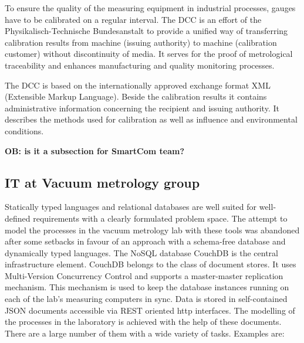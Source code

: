 \documentclass[3p,times,procedia]{elsarticle}
\begin{document}
To ensure the quality of the measuring equipment in industrial
processes, gauges have to be calibrated on a regular interval. The
DCC is an effort of the Physikalisch-Technische Bundesanstalt to provide
a unified way of transferring calibration results from machine (issuing authority) to
machine (calibration customer) without discontinuity of media. It
serves for the proof of metrological traceability and enhances 
manufacturing and quality monitoring processes.

The DCC is based on the internationally approved exchange format
XML (Extensible Markup Language). Beside the calibration results it
contains administrative information concerning the recipient and
issuing authority. It describes the methods used for calibration as well as
influence and environmental conditions.






\textbf{OB: is it a subsection for SmartCom team?}

\subsection{IT at Vacuum metrology group}
\label{ssec:vlit}

Statically typed languages and relational databases are well suited
for well-defined requirements with a clearly formulated problem space.
The attempt to model the processes in the vacuum metrology lab with
these tools was abandoned after some setbacks in favour of an approach
with a schema-free database and dynamically typed languages.
The NoSQL database CouchDB \cite{couch} is the central infrastructure
element. CouchDB belongs to the class of document stores. It uses
Multi-Version Concurrency Control \cite{mvcc} and supports a master-master
replication mechanism. This mechanism is used to keep the database
instances running on each of the lab's measuring computers in sync.
Data is stored in self-contained JSON documents accessible via
REST \cite{fielding2000architectural} oriented http interfaces. The
modelling of the processes in the laboratory is achieved with the help of
these documents. There are a large number of them with a wide variety
of tasks. Examples are:
\end{document}
